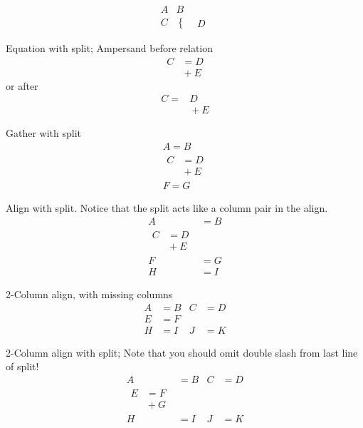 \documentclass[a4paper]{book}
\begin{document}
\begin{align*}
A & B\\
C &\left\{\begin{aligned}
& D \end{aligned}\right.
\end{align*}

Equation with split; Ampersand before relation
\begin{equation}
\begin{split}
C &= D \\
&{}+E
\end{split}
\end{equation}
or after
\begin{equation}
\begin{split}
C =& D \\
&{}+E
\end{split}
\end{equation}

Gather with split
\begin{gather}
A = B \\
\begin{split}
C &= D \\
&{}+E
\end{split}\\
 F = G
\end{gather}

Align with split.
Notice that the split acts like a column pair in the align.
\begin{align}
A &= B \\
\begin{split}
C &= D \\
&{}+E
\end{split}\\
 F &= G\\
H &= I
\end{align}

2-Column align, with missing columns
\begin{align}
  A &= B &
 C &= D \\
  E &= F \\
  H &=  I &
  J &= K
\end{align}

2-Column align with split;
Note that you should omit double slash from last line of split!
\begin{align}
  A &= B &
 C &= D \\
\begin{split}
  E &= F \\
    &{} + G
\end{split}\\
  H &=  I &
  J &= K
\end{align}
\end{document}
